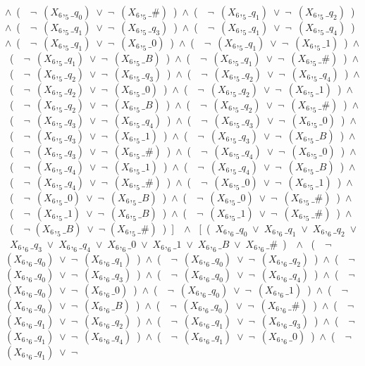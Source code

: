 ﻿\documentclass[a4paper,10pt]{article}
\begin{document}
$\wedge$\ (\ \ $\neg$\ $(X_6,_5\_q_0)$\ $\vee$\ $\neg$\ $(X_6,_5\_\#)$\ )\ $\wedge$\ (\ \ $\neg$\ $(X_6,_5\_q_1)$\ $\vee$\ $\neg$\ $(X_6,_5\_q_2)$\ )\ $\wedge$\ (\ \ $\neg$\ $(X_6,_5\_q_1)$\ $\vee$\ $\neg$\ $(X_6,_5\_q_3)$\ )\ $\wedge$\ (\ \ $\neg$\ $(X_6,_5\_q_1)$\ $\vee$\ $\neg$\ $(X_6,_5\_q_4)$\ )\ $\wedge$\ (\ \ $\neg$\ $(X_6,_5\_q_1)$\ $\vee$\ $\neg$\ $(X_6,_5\_0)$\ )\ $\wedge$\ (\ \ $\neg$\ $(X_6,_5\_q_1)$\ $\vee$\ $\neg$\ $(X_6,_5\_1)$\ )\ $\wedge$\ (\ \ $\neg$\ $(X_6,_5\_q_1)$\ $\vee$\ $\neg$\ $(X_6,_5\_B)$\ )\ $\wedge$\ (\ \ $\neg$\ $(X_6,_5\_q_1)$\ $\vee$\ $\neg$\ $(X_6,_5\_\#)$\ )\ $\wedge$\ (\ \ $\neg$\ $(X_6,_5\_q_2)$\ $\vee$\ $\neg$\ $(X_6,_5\_q_3)$\ )\ $\wedge$\ (\ \ $\neg$\ $(X_6,_5\_q_2)$\ $\vee$\ $\neg$\ $(X_6,_5\_q_4)$\ )\ $\wedge$\ (\ \ $\neg$\ $(X_6,_5\_q_2)$\ $\vee$\ $\neg$\ $(X_6,_5\_0)$\ )\ $\wedge$\ (\ \ $\neg$\ $(X_6,_5\_q_2)$\ $\vee$\ $\neg$\ $(X_6,_5\_1)$\ )\ $\wedge$\ (\ \ $\neg$\ $(X_6,_5\_q_2)$\ $\vee$\ $\neg$\ $(X_6,_5\_B)$\ )\ $\wedge$\ (\ \ $\neg$\ $(X_6,_5\_q_2)$\ $\vee$\ $\neg$\ $(X_6,_5\_\#)$\ )\ $\wedge$\ (\ \ $\neg$\ $(X_6,_5\_q_3)$\ $\vee$\ $\neg$\ $(X_6,_5\_q_4)$\ )\ $\wedge$\ (\ \ $\neg$\ $(X_6,_5\_q_3)$\ $\vee$\ $\neg$\ $(X_6,_5\_0)$\ )\ $\wedge$\ (\ \ $\neg$\ $(X_6,_5\_q_3)$\ $\vee$\ $\neg$\ $(X_6,_5\_1)$\ )\ $\wedge$\ (\ \ $\neg$\ $(X_6,_5\_q_3)$\ $\vee$\ $\neg$\ $(X_6,_5\_B)$\ )\ $\wedge$\ (\ \ $\neg$\ $(X_6,_5\_q_3)$\ $\vee$\ $\neg$\ $(X_6,_5\_\#)$\ )\ $\wedge$\ (\ \ $\neg$\ $(X_6,_5\_q_4)$\ $\vee$\ $\neg$\ $(X_6,_5\_0)$\ )\ $\wedge$\ (\ \ $\neg$\ $(X_6,_5\_q_4)$\ $\vee$\ $\neg$\ $(X_6,_5\_1)$\ )\ $\wedge$\ (\ \ $\neg$\ $(X_6,_5\_q_4)$\ $\vee$\ $\neg$\ $(X_6,_5\_B)$\ )\ $\wedge$\ (\ \ $\neg$\ $(X_6,_5\_q_4)$\ $\vee$\ $\neg$\ $(X_6,_5\_\#)$\ )\ $\wedge$\ (\ \ $\neg$\ $(X_6,_5\_0)$\ $\vee$\ $\neg$\ $(X_6,_5\_1)$\ )\ $\wedge$\ (\ \ $\neg$\ $(X_6,_5\_0)$\ $\vee$\ $\neg$\ $(X_6,_5\_B)$\ )\ $\wedge$\ (\ \ $\neg$\ $(X_6,_5\_0)$\ $\vee$\ $\neg$\ $(X_6,_5\_\#)$\ )\ $\wedge$\ (\ \ $\neg$\ $(X_6,_5\_1)$\ $\vee$\ $\neg$\ $(X_6,_5\_B)$\ )\ $\wedge$\ (\ \ $\neg$\ $(X_6,_5\_1)$\ $\vee$\ $\neg$\ $(X_6,_5\_\#)$\ )\ $\wedge$\ (\ \ $\neg$ $(X_6,_5\_B)$\ $\vee$\ $\neg$ $(X_6,_5\_\#)$\ )\ ]\ \ $\wedge$ \ [\ (\ $X_6,_6\_q_0$\ $\vee$\ $X_6,_6\_q_1$\ $\vee$\ $X_6,_6\_q_2$\ $\vee$\ $X_6,_6\_q_3$\ $\vee$\ $X_6,_6\_q_4$\ $\vee$\ $X_6,_6\_0$\ $\vee$\ $X_6,_6\_1$\ $\vee$\ $X_6,_6\_B$\ $\vee$\ $X_6,_6\_\#$\ )\ \ $\wedge$ \ (\ \ $\neg$\ $(X_6,_6\_q_0)$\ $\vee$\ $\neg$\ $(X_6,_6\_q_1)$\ )\ $\wedge$\ (\ \ $\neg$\ $(X_6,_6\_q_0)$\ $\vee$\ $\neg$\ $(X_6,_6\_q_2)$\ )\ $\wedge$\ (\ \ $\neg$\ $(X_6,_6\_q_0)$\ $\vee$\ $\neg$\ $(X_6,_6\_q_3)$\ )\ $\wedge$\ (\ \ $\neg$\ $(X_6,_6\_q_0)$\ $\vee$\ $\neg$\ $(X_6,_6\_q_4)$\ )\ $\wedge$\ (\ \ $\neg$\ $(X_6,_6\_q_0)$\ $\vee$\ $\neg$\ $(X_6,_6\_0)$\ )\ $\wedge$\ (\ \ $\neg$\ $(X_6,_6\_q_0)$\ $\vee$\ $\neg$\ $(X_6,_6\_1)$\ )\ $\wedge$\ (\ \ $\neg$\ $(X_6,_6\_q_0)$\ $\vee$\ $\neg$\ $(X_6,_6\_B)$\ )\ $\wedge$\ (\ \ $\neg$\ $(X_6,_6\_q_0)$\ $\vee$\ $\neg$\ $(X_6,_6\_\#)$\ )\ $\wedge$\ (\ \ $\neg$\ $(X_6,_6\_q_1)$\ $\vee$\ $\neg$\ $(X_6,_6\_q_2)$\ )\ $\wedge$\ (\ \ $\neg$\ $(X_6,_6\_q_1)$\ $\vee$\ $\neg$\ $(X_6,_6\_q_3)$\ )\ $\wedge$\ (\ \ $\neg$\ $(X_6,_6\_q_1)$\ $\vee$\ $\neg$\ $(X_6,_6\_q_4)$\ )\ $\wedge$\ (\ \ $\neg$\ $(X_6,_6\_q_1)$\ $\vee$\ $\neg$\ $(X_6,_6\_0)$\ )\ $\wedge$\ (\ \ $\neg$\ $(X_6,_6\_q_1)$\ $\vee$\ $\neg$\ 
\end{document}
